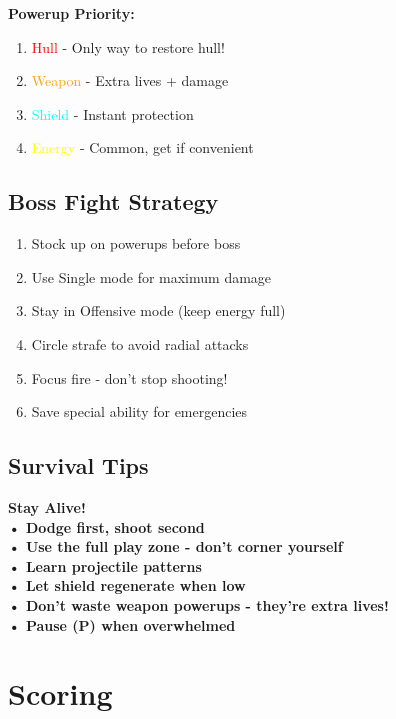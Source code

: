 \documentclass[11pt,a4paper]{article}
\newcommand{\infobox}[2]{%
    \vspace{0.3cm}
    \noindent\colorbox{#1!10}{%
        \parbox{\dimexpr\textwidth-2\fboxsep}{%
            \textcolor{#1}{\textbf{#2}}
        }
    }
    \vspace{0.3cm}
}
\begin{document}
\textbf{Powerup Priority:}
\begin{enumerate}
    \item \textcolor{red}{Hull} - Only way to restore hull!
    \item \textcolor{orange}{Weapon} - Extra lives + damage
    \item \textcolor{cyan}{Shield} - Instant protection
    \item \textcolor{yellow}{Energy} - Common, get if convenient
\end{enumerate}

\subsection{Boss Fight Strategy}

\begin{enumerate}
    \item Stock up on powerups before boss
    \item Use Single mode for maximum damage
    \item Stay in Offensive mode (keep energy full)
    \item Circle strafe to avoid radial attacks
    \item Focus fire - don't stop shooting!
    \item Save special ability for emergencies
\end{enumerate}

\subsection{Survival Tips}

\infobox{successcolor}{\textbf{Stay Alive!}\\
• Dodge first, shoot second\\
• Use the full play zone - don't corner yourself\\
• Learn projectile patterns\\
• Let shield regenerate when low\\
• Don't waste weapon powerups - they're extra lives!\\
• Pause (P) when overwhelmed}

\section{Scoring}
\end{document}
